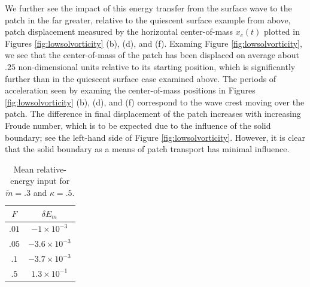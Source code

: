 \documentclass[a4paper,11pt]{article}
\begin{document}
We further see the impact of this energy transfer from the surface wave to the patch in the far greater, relative to the quiescent surface example from above, patch displacement measured by the horizontal center-of-mass $x_{c}(t)$ plotted in Figures \ref{fig:lowsolvorticity} (b), (d), and (f).  Examing Figure \ref{fig:lowsolvorticity}, we see that the center-of-mass of the patch has been displaced on average about $.25$ non-dimensional units relative to its starting position, which is significantly further than in the quiescent surface case examined above.  The periods of acceleration seen by examing the center-of-mass positions in Figures \ref{fig:lowsolvorticity} (b), (d), and (f) correspond to the wave crest moving over the patch.  The difference in final displacement of the patch increases with increasing Froude number, which is to be expected due to the influence of the solid boundary; see the left-hand side of Figure \ref{fig:lowsolvorticity}.  However, it is clear that the solid boundary as a means of patch transport has minimal influence.
\begin{table}
\centering
\begin{tabular}{c|c}
$F$ & $\delta E_{m}$ \\
\hline
$.01$ & $-1\times 10^{-3}$\\
$.05$ & $-3.6\times 10^{-3}$\\
$.1$ & $-3.7\times 10^{-3}$\\
$.5$ & $1.3\times 10^{-1}$
\end{tabular}
\caption{Mean relative-energy input for $\tilde{m}=.3$ and $\kappa=.5$.}
\label{tab:lowsolmean}
\end{table}
\end{document}
